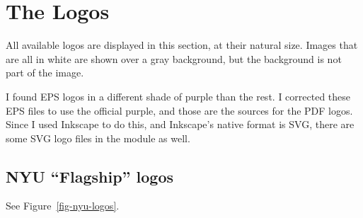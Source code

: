 \documentclass{ltxdoc}
\begin{document}
\section{The Logos}

All available logos are displayed in this section, at their natural size.  Images 
that are all in white are shown over a gray background, but the background is not 
part of the image.

I found EPS logos in a different shade of purple than the rest.  I corrected these
EPS files to use the official purple, and those are the sources for the PDF logos. 
Since I used Inkscape to do this, and Inkscape's native format is SVG, there are 
some SVG logo files in the module as well.  

\subsection{NYU “Flagship” logos}

See Figure~\ref{fig-nyu-logos}.
\end{document}
